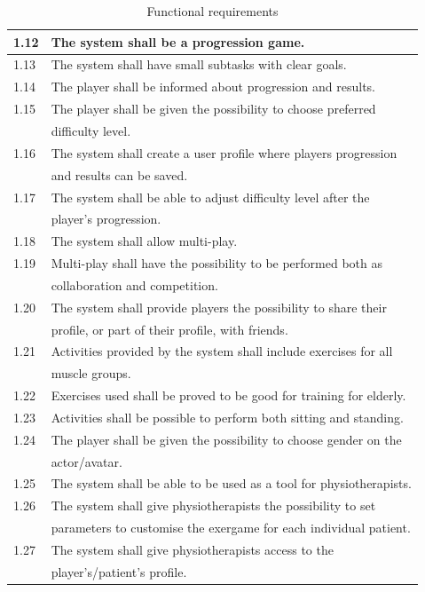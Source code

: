 \begin{table} [H]
\centering
\begin{tabular}{|l|l|}
\hline
1.12 & The system shall be a progression game.\\ \hline
1.13 & The system shall have small subtasks with clear goals.\\ \hline
1.14 & The player shall be informed about progression and results.\\ \hline
1.15 & The player shall be given the possibility to choose preferred \\ & difficulty level.\\ \hline
1.16 & The system shall create a user profile where players progression \\ & and results can be saved.\\ \hline
1.17 & The system shall be able to adjust difficulty level after the \\ & player's progression.\\ \hline
1.18 & The system shall allow multi-play.\\ \hline
1.19 & Multi-play shall have the possibility to be performed both as \\ & collaboration and competition.\\ \hline
1.20 & The system shall provide players the possibility to share their \\ & profile, or part of their profile, with friends. \\ \hline
1.21 & Activities provided by the system shall include exercises for all \\ & muscle groups.\\ \hline
1.22 & Exercises used shall be proved to be good for training for elderly.\\ \hline
1.23 & Activities shall be possible to perform both sitting and standing. \\ \hline
1.24 & The player shall be given the possibility to choose gender on the \\ &  actor/avatar. \\ \hline
1.25 & The system shall be able to be used as a tool for physiotherapists.\\ \hline
1.26 & The system shall give physiotherapists the possibility to set \\ & parameters to customise the exergame for each individual patient.\\ \hline
1.27 & The system shall give physiotherapists access to the \\ & player's/patient's profile. \\ \hline  
\end{tabular}
\caption[Functional requirements]{Functional requirements}
\label{tab:func2}
\end{table} 


